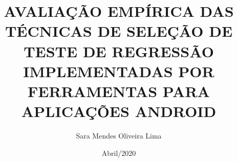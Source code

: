 \documentclass[pt, qual, classic, oneside, a4paper, scr]{ufba/ufbathesis}
\institute{Instituto de Matem\'{a}tica e Estatística}
\title{AVALIAÇÃO EMPÍRICA DAS TÉCNICAS DE SELEÇÃO DE TESTE DE REGRESSÃO IMPLEMENTADAS POR FERRAMENTAS PARA APLICAÇÕES ANDROID}
\date{Abril/2020}
\author{Sara Mendes Oliveira Lima}
\begin{document}
\pgcompfrontpage
\frontmatter

\pgcomppresentationpage



\tableofcontents
\listoffigures
\listoftables



\mainmatter






\backmatter





\end{document}
